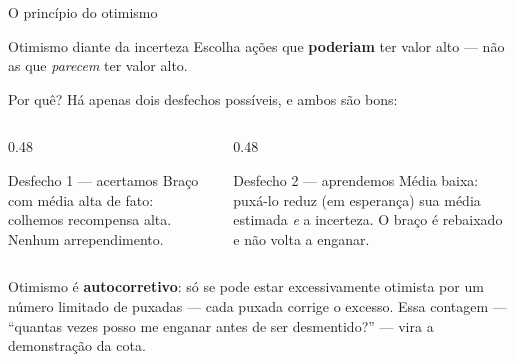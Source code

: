 \documentclass[aspectratio=169, 10pt]{beamer}
\begin{document}
\begin{frame}{O princípio do otimismo}
  \begin{defbox}{Otimismo diante da incerteza}
    Escolha ações que \textbf{poderiam} ter valor alto --- não as que
    \emph{parecem} ter valor alto.
  \end{defbox}

  \pause
  Por quê? Há apenas dois desfechos possíveis, e ambos são bons:

  \begin{columns}[T]
    \begin{column}{0.48\textwidth}
      \begin{teobox}{Desfecho 1 --- acertamos}
        Braço com média alta de fato: colhemos recompensa alta. Nenhum
        arrependimento.
      \end{teobox}
    \end{column}
    \begin{column}{0.48\textwidth}
      \begin{teobox}{Desfecho 2 --- aprendemos}
        Média baixa: puxá-lo reduz (em esperança) sua média estimada
        \emph{e} a incerteza. O braço é rebaixado e não volta a enganar.
      \end{teobox}
    \end{column}
  \end{columns}

  \pause
  \begin{ideiabox}
    Otimismo é \textbf{autocorretivo}: só se pode estar excessivamente
    otimista por um número limitado de puxadas — cada puxada corrige o
    excesso. Essa contagem --- ``quantas vezes posso me enganar antes de
    ser desmentido?'' --- vira a demonstração da cota.
  \end{ideiabox}
\end{frame}
\end{document}
